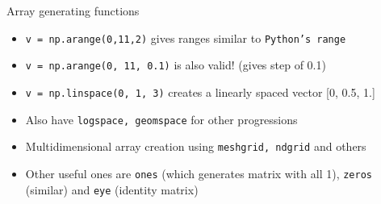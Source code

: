 \documentclass[presentation]{beamer}
\begin{document}
\begin{frame}[label={sec:org06896aa},fragile]{Array generating functions}
\begin{itemize}
\item \texttt{v = np.arange(0,11,2)} gives ranges similar to \texttt{Python's range}
\item \texttt{v = np.arange(0, 11, 0.1)} is also valid! (gives step of 0.1)
\item \texttt{v = np.linspace(0, 1, 3)} creates a linearly spaced vector [0, 0.5, 1.]
\item Also have \texttt{logspace, geomspace} for other progressions
\item Multidimensional array creation using \texttt{meshgrid, ndgrid} and others
\item Other useful ones are \texttt{ones} (which generates matrix with all 1), \texttt{zeros}
(similar) and \texttt{eye} (identity matrix)
\end{itemize}
\end{frame}
\end{document}
